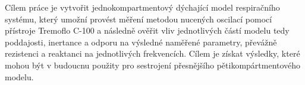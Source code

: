 Cílem práce je vytvořit jednokompartmentový dýchající model respiračního systému, který umožní provést měření metodou nucených oscilací pomocí přístroje Tremoflo C-100 a následně ověřit vliv jednotlivých částí modelu tedy poddajosti, inertance a odporu na výsledné naměřené parametry, převážně rezistenci a reaktanci na jednotlivých frekvencích. Cílem je získat výsledky, které mohou být v budoucnu použity pro sestrojení přesnějšího pětikompártmentového modelu.

